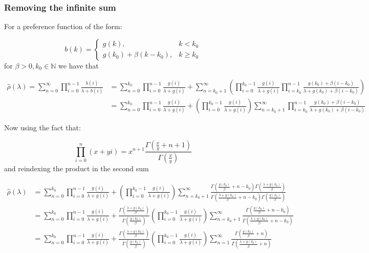 \documentclass[
  sn-basic,
]{sn-jnl}
\theoremstyle{plain}
\theoremstyle{remark}
\begin{document}
\subsubsection{Removing the infinite
sum}\label{removing-the-infinite-sum}

For a preference function of the form:

\[
b(k) = \begin{cases}
g(k),&k<k_0\\
g(k_0) + \beta(k-k_0), &k\ge k_0
\end{cases}
\] for \(\beta>0, k_0\in\mathbb N\) we have that

\begin{align*}
\hat\rho(\lambda) = \sum_{n=0}^\infty\prod_{i=0}^{n-1}\frac{b(i)}{\lambda+b(i)} &= \sum_{n=0}^{k_0}\prod_{i=0}^{n-1}\frac{g(i)}{\lambda+g(i)} + \sum_{n=k_0+1}^\infty\left(\prod_{i=0}^{k_0-1}\frac{g(i)}{\lambda+g(i)}\prod_{i=k_0}^{n-1}\frac{g(k_0) + \beta(i-k_0)}{\lambda +g(k_0) + \beta(i-k_0)}\right)\\
&=\sum_{n=0}^{k_0}\prod_{i=0}^{n-1}\frac{g(i)}{\lambda+g(i)} + \left(\prod_{i=0}^{k_0-1}\frac{g(i)}{\lambda+g(i)}\right)\sum_{n=k_0+1}^\infty\prod_{i=k_0}^{n-1}\frac{g(k_0) + \beta(i-k_0)}{\lambda +g(k_0) + \beta(i-k_0)}
\end{align*}

Now using the fact that:

\[
\prod_{i=0}^n(x+yi) = x^{n+1}\frac{\Gamma(\frac{x}{y}+n+1)}{\Gamma(\frac{x}{y})}
\] and reindexing the product in the second sum

\begin{align*}
\hat\rho(\lambda) &= \sum_{n=0}^{k_0}\prod_{i=0}^{n-1}\frac{g(i)}{\lambda+g(i)} + \left(\prod_{i=0}^{k_0-1}\frac{g(i)}{\lambda+g(i)}\right)\sum_{n=k_0+1}^\infty\frac{\Gamma\left(\frac{g(k_0)}{\beta}+n-k_0\right)\Gamma\left(\frac{\lambda+g(k_0)}{\beta}\right)}{\Gamma\left(\frac{\lambda+g(k_0)}{\beta}+n-k_0\right)\Gamma\left(\frac{g(k_0)}{\beta}\right)}\\
&= \sum_{n=0}^{k_0}\prod_{i=0}^{n-1}\frac{g(i)}{\lambda+g(i)} + \frac{\Gamma\left(\frac{\lambda+g(k_0)}{\beta}\right)}{\Gamma\left(\frac{g(k_0)}{\beta}\right)}\left(\prod_{i=0}^{k_0-1}\frac{g(i)}{\lambda+g(i)}\right)\sum_{n=k_0+1}^\infty\frac{\Gamma\left(\frac{g(k_0)}{\beta}+n-k_0\right)}{\Gamma\left(\frac{\lambda+g(k_0)}{\beta}+n-k_0\right)}\\
&=\sum_{n=0}^{k_0}\prod_{i=0}^{n-1}\frac{g(i)}{\lambda+g(i)} + \frac{\Gamma\left(\frac{\lambda+g(k_0)}{\beta}\right)}{\Gamma\left(\frac{g(k_0)}{\beta}\right)}\left(\prod_{i=0}^{k_0-1}\frac{g(i)}{\lambda+g(i)}\right)\sum_{n=1}^\infty\frac{\Gamma\left(\frac{g(k_0)}{\beta}+n\right)}{\Gamma\left(\frac{\lambda+g(k_0)}{\beta}+n\right)}
\end{align*}
\end{document}
